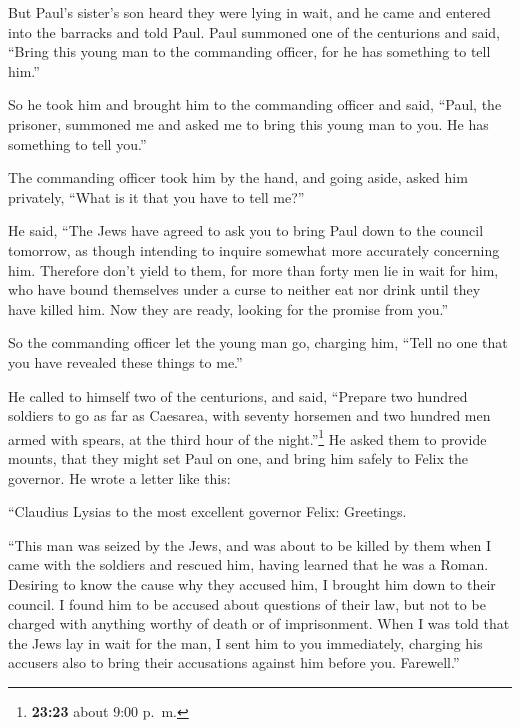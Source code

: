  But Paul's sister's son heard they were lying in wait,
and he came and entered into the barracks and told Paul. 
Paul summoned one of the centurions and said, ``Bring this young man to
the commanding officer, for he has something to tell him.''

 So he took him and brought him to the commanding officer
and said, ``Paul, the prisoner, summoned me and asked me to bring this
young man to you. He has something to tell you.''

 The commanding officer took him by the hand, and going
aside, asked him privately, ``What is it that you have to tell me?''

 He said, ``The Jews have agreed to ask you to bring Paul
down to the council tomorrow, as though intending to inquire somewhat
more accurately concerning him.  Therefore don't yield to
them, for more than forty men lie in wait for him, who have bound
themselves under a curse to neither eat nor drink until they have killed
him. Now they are ready, looking for the promise from you.''

 So the commanding officer let the young man go, charging
him, ``Tell no one that you have revealed these things to me.''

 He called to himself two of the centurions, and said,
``Prepare two hundred soldiers to go as far as Caesarea, with seventy
horsemen and two hundred men armed with spears, at the third hour of the
night.''\footnote{\textbf{23:23} about 9:00 p.~m.}  He
asked them to provide mounts, that they might set Paul on one, and bring
him safely to Felix the governor.  He wrote a letter like
this:

 ``Claudius Lysias to the most excellent governor Felix:
Greetings.

 ``This man was seized by the Jews, and was about to be
killed by them when I came with the soldiers and rescued him, having
learned that he was a Roman.  Desiring to know the cause
why they accused him, I brought him down to their council.
 I found him to be accused about questions of their law,
but not to be charged with anything worthy of death or of imprisonment.
 When I was told that the Jews lay in wait for the man, I
sent him to you immediately, charging his accusers also to bring their
accusations against him before you. Farewell.''

